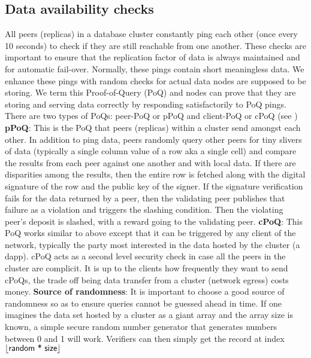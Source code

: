 \subsection{Data availability checks} \label{sec:poq}
All peers (replicas) in a database cluster constantly ping each other (once every 10 seconds) to check if they are still reachable from one another. These checks are important to ensure that the replication factor of data is always maintained and for automatic fail-over. Normally, these pings contain short meaningless data. We enhance these pings with random checks for actual data nodes are supposed to be storing. We term this \textsf{Proof-of-Query (PoQ)} and nodes can prove that they are storing and serving data correctly by responding satisfactorily to \textsf{PoQ} pings. There are two types of \textsf{PoQ}s: \textsf{peer-PoQ or pPoQ} and \textsf{client-PoQ or cPoQ} (see )
\newline
\newline
\textbf{pPoQ}: This is the \textsf{PoQ} that peers (replicas) within a cluster send amongst each other. In addition to ping data, peers randomly query other peers for tiny slivers of data (typically a single column value of a row aka a single cell) and compare the results from each peer against one another and with local data. If there are disparities among the results, then the entire row is fetched along with the digital signature of the row and the public key of the signer. If the signature verification fails for the data returned by a peer, then the validating peer publishes that failure as a violation and triggers the slashing condition. Then the violating peer's deposit is slashed, with a reward going to the validating peer.
\newline
\newline
\textbf{cPoQ}: This \textsf{PoQ} works similar to above except that it can be triggered by any client of the network, typically the party most interested in the data hosted by the cluster (a dapp). \textsf{cPoQ} acts as a second level security check in case all the peers in the cluster are complicit. It is up to the clients how frequently they want to send \textsf{cPoQ}s, the trade off being data transfer from a cluster (network egress) costs money.
\newline
\newline
\textbf{Source of randomness}: It is important to choose a good source of randomness so as to ensure queries cannot be guessed ahead in time. If one imagines the data set hosted by a cluster as a giant array and the array size is known, a simple secure random number generator that generates numbers between 0 and 1 will work. Verifiers can then simply get the record at index $ \lfloor\textsf{random * size}\rfloor $
